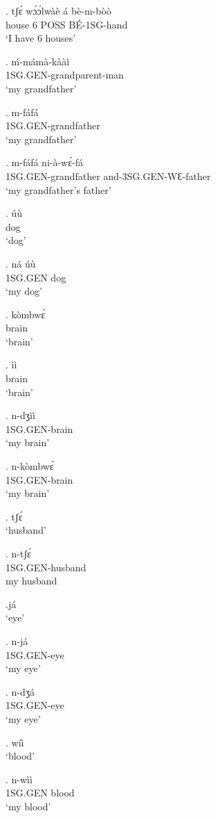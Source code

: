 \documentclass{assets/fieldnotes}
\begin{document}
\exg. tʃɛ́ wɔ́ɔ́lwàè á bè-m-bòò\\
house  6  POSS BÉ-1SG-hand\\
`I have 6 houses'

\exg. \'{m}-m\'{a}m\`{a}-k\`{a}\`{a}\`{i} \\
1SG.GEN-grandparent-man \\
`my grandfather'

\exg. m-fáfá\\
1SG.GEN-grandfather\\
`my grandfather'

\exg. m-fáfá ni-à-wɛ́-fá\\
1SG.GEN-grandfather and-3SG.GEN-WƐ-father\\
`my grandfather's father'


\exg. úù\\
dog\\
`dog'

\exg. ná úù\\
1SG.GEN dog\\
`my dog'

\exg. kòmbwɛ́\\
brain\\
`brain'

\exg. ìì\\
brain\\
`brain'

\exg. n-dʒìì\\
1SG.GEN-brain\\
`my brain'

 \exg. n-kòmbwɛ́\\
1SG.GEN-brain\\
`my brain'

\ex. tʃɛ́\\
`husband'

\exg. n-tʃɛ́\\
1SG.GEN-husband\\
my husband

\ex.já\\
`eye'

\exg. n-já\\
1SG.GEN-eye\\
`my eye'

\exg. n-dʒá\\
1SG.GEN-eye\\
`my eye'

\ex. wíì\\
`blood'

\exg. n-wìì\\
1SG.GEN blood\\
`my blood'
\end{document}
